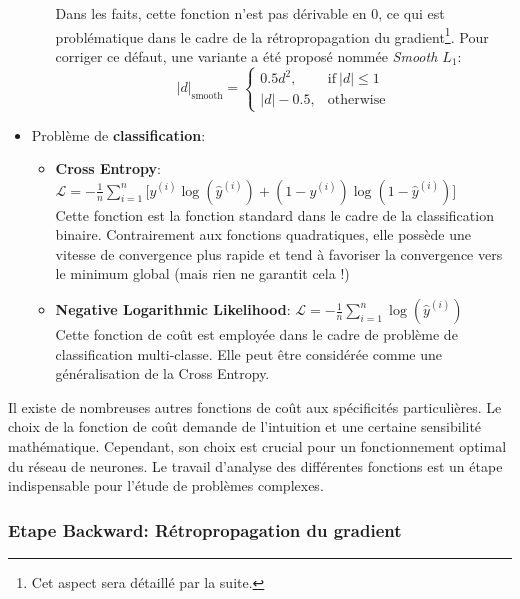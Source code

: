 \begin{itemize}
\begin{itemize}
        Dans les faits, cette fonction n'est pas dérivable en 0, ce qui est problématique dans le cadre de la rétropropagation du gradient\footnote{Cet aspect sera détaillé par la suite.}. Pour corriger ce défaut, une variante a été proposé nommée \textit{Smooth $L_1$}:
        $$| d |_{\text{smooth}} =   \begin{cases}
          0.5 d^2, & \text{if}\ | d  | \leq 1 \\
          | d | - 0.5, & \text{otherwise}
        \end{cases}$$
    \end{itemize}
    \item Problème de \textbf{classification}:
    \begin{itemize}
        \item \textbf{Cross Entropy}: $\boldsymbol{\mathcal{L}}=-\frac{1}{n}\sum_{i=1}^{n}\big[y^{(i)}\log(\hat{y}^{(i)})+(1-y^{(i)})\log(1-\hat{y}^{(i)})\big]$\\

        Cette fonction est la fonction standard dans le cadre de la classification binaire. Contrairement aux fonctions quadratiques, elle possède une vitesse de convergence plus rapide et tend à favoriser la convergence vers le minimum global (mais rien ne garantit cela !)\\

        \item \textbf{Negative Logarithmic Likelihood}: $\boldsymbol{\mathcal{L}}=-\frac{1}{n}\sum_{i=1}^{n}\log(\hat{y}^{(i)})$\\

        Cette fonction de coût est employée dans le cadre de problème de classification multi-classe. Elle peut être considérée comme une généralisation de la Cross Entropy.

    \end{itemize}
\end{itemize}

\noindent Il existe de nombreuses autres fonctions de coût aux spécificités particulières. Le choix de la fonction de coût demande de l'intuition et une certaine sensibilité mathématique. Cependant, son choix est crucial pour un fonctionnement optimal du réseau de neurones. Le travail d'analyse des différentes fonctions est un étape indispensable pour l'étude de problèmes complexes.\\

\subsubsection{Etape Backward: Rétropropagation du gradient}
\label{backward}

